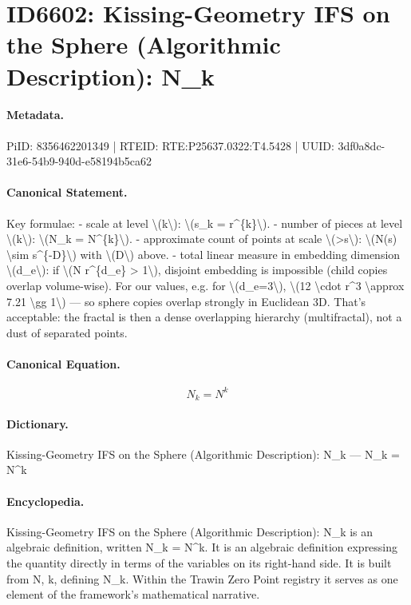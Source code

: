 \section*{ID6602: Kissing-Geometry IFS on the Sphere (Algorithmic Description): N\_k}
\paragraph{Metadata.}
PiID: 8356462201349 | RTEID: RTE:P25637.0322:T4.5428 | UUID: 3df0a8dc-31e6-54b9-940d-e58194b5ca62

\paragraph{Canonical Statement.}
Key formulae: - scale at level \textbackslash{}(k\textbackslash{}): \textbackslash{}(s\_k = r\textasciicircum{}\{k\}\textbackslash{}). - number of pieces at level \textbackslash{}(k\textbackslash{}): \textbackslash{}(N\_k = N\textasciicircum{}\{k\}\textbackslash{}). - approximate count of points at scale \textbackslash{}(>s\textbackslash{}): \textbackslash{}(N(s) \textbackslash{}sim s\textasciicircum{}\{-D\}\textbackslash{}) with \textbackslash{}(D\textbackslash{}) above. - total linear measure in embedding dimension \textbackslash{}(d\_e\textbackslash{}): if \textbackslash{}(N r\textasciicircum{}\{d\_e\} > 1\textbackslash{}), disjoint embedding is impossible (child copies overlap volume-wise). For our values, e.g. for \textbackslash{}(d\_e=3\textbackslash{}), \textbackslash{}(12 \textbackslash{}cdot r\textasciicircum{}3 \textbackslash{}approx 7.21 \textbackslash{}gg 1\textbackslash{}) — so sphere copies overlap strongly in Euclidean 3D. That’s acceptable: the fractal is then a dense overlapping hierarchy (multifractal), not a dust of separated points.

\paragraph{Canonical Equation.}
\[
N_k = N^{k}
\]

\paragraph{Dictionary.}
Kissing-Geometry IFS on the Sphere (Algorithmic Description): N\_k — N\_k = N\textasciicircum{}k

\paragraph{Encyclopedia.}
Kissing-Geometry IFS on the Sphere (Algorithmic Description): N\_k is an algebraic definition, written N\_k = N\textasciicircum{}k. It is an algebraic definition expressing the quantity directly in terms of the variables on its right-hand side. It is built from N, k, defining N\_k. Within the Trawin Zero Point registry it serves as one element of the framework's mathematical narrative.

